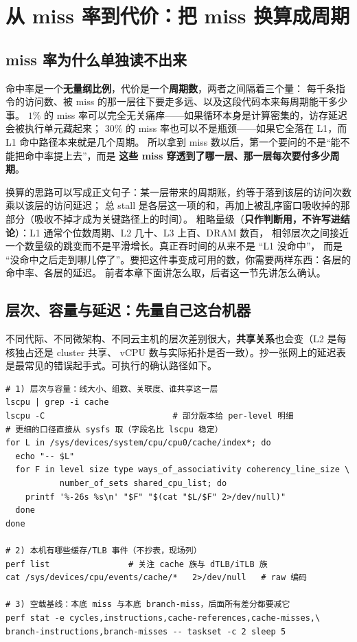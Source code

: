 \documentclass[12pt,a4paper,fontset=fandol]{ctexbook}
\begin{document}
\section{从 miss 率到代价：把 miss 换算成周期}
\label{sec:pm06-misscost}

\subsection{miss 率为什么单独读不出来}

命中率是一个\textbf{无量纲比例}，代价是一个\textbf{周期数}，两者之间隔着三个量：
每千条指令的访问数、被 miss 的那一层往下要走多远、以及这段代码本来每周期能干多少事。
$1\%$ 的 miss 率可以完全无关痛痒——如果循环本身是计算密集的，访存延迟会被执行单元藏起来；
$30\%$ 的 miss 率也可以不是瓶颈——如果它全落在 L1，而 L1 命中路径本来就是几个周期。
所以拿到 miss 数以后，第一个要问的不是``能不能把命中率提上去''，而是
\textbf{这些 miss 穿透到了哪一层、那一层每次要付多少周期}。

换算的思路可以写成正文句子：某一层带来的周期账，约等于落到该层的访问次数乘以该层的访问延迟；
总 stall 是各层这一项的和，再加上被乱序窗口吸收掉的那部分（吸收不掉才成为关键路径上的时间）。
粗略量级（\textbf{只作判断用，不许写进结论}）：L1 通常个位数周期、L2 几十、L3 上百、DRAM 数百，
相邻层次之间接近一个数量级的跳变而不是平滑增长。真正吞时间的从来不是 ``L1 没命中''，
而是 ``没命中之后走到哪儿停了''。要把这件事变成可用的数，你需要两样东西：各层的命中率、各层的延迟。
前者本章下面讲怎么取，后者这一节先讲怎么确认。

\subsection{层次、容量与延迟：先量自己这台机器}

不同代际、不同微架构、不同云主机的层次差别很大，\textbf{共享关系}也会变（L2 是每核独占还是 cluster 共享、
vCPU 数与实际拓扑是否一致）。抄一张网上的延迟表是最常见的错误起手式。可执行的确认路径如下。

\begin{lstlisting}[style=shellstyle,caption={在自己机器上确认缓存层次与线路径},label={lst:pm06-hier}]
# 1) 层次与容量：线大小、组数、关联度、谁共享这一层
lscpu | grep -i cache
lscpu -C                          # 部分版本给 per-level 明细
# 更细的口径直接从 sysfs 取（字段名比 lscpu 稳定）
for L in /sys/devices/system/cpu/cpu0/cache/index*; do
  echo "-- $L"
  for F in level size type ways_of_associativity coherency_line_size \
           number_of_sets shared_cpu_list; do
    printf '%-26s %s\n' "$F" "$(cat "$L/$F" 2>/dev/null)"
  done
done

# 2) 本机有哪些缓存/TLB 事件（不抄表，现场列）
perf list                # 关注 cache 族与 dTLB/iTLB 族
cat /sys/devices/cpu/events/cache/*   2>/dev/null   # raw 编码

# 3) 空载基线：本底 miss 与本底 branch-miss，后面所有差分都要减它
perf stat -e cycles,instructions,cache-references,cache-misses,\
branch-instructions,branch-misses -- taskset -c 2 sleep 5
\end{lstlisting}
\end{document}
